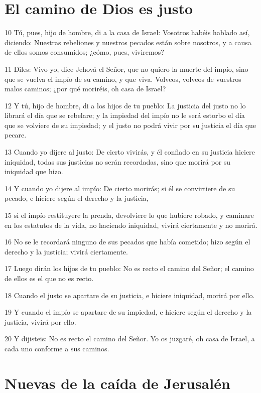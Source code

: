 \section*{El camino de Dios es justo}

\par 10 Tú, pues, hijo de hombre, di a la casa de Israel: Vosotros habéis hablado así, diciendo: Nuestras rebeliones y nuestros pecados están sobre nosotros, y a causa de ellos somos consumidos; ¿cómo, pues, viviremos?
\par 11 Diles: Vivo yo, dice Jehová el Señor, que no quiero la muerte del impío, sino que se vuelva el impío de su camino, y que viva. Volveos, volveos de vuestros malos caminos; ¿por qué moriréis, oh casa de Israel?
\par 12 Y tú, hijo de hombre, di a los hijos de tu pueblo: La justicia del justo no lo librará el día que se rebelare; y la impiedad del impío no le será estorbo el día que se volviere de su impiedad; y el justo no podrá vivir por su justicia el día que pecare.
\par 13 Cuando yo dijere al justo: De cierto vivirás, y él confiado en su justicia hiciere iniquidad, todas sus justicias no serán recordadas, sino que morirá por su iniquidad que hizo.
\par 14 Y cuando yo dijere al impío: De cierto morirás; si él se convirtiere de su pecado, e hiciere según el derecho y la justicia,
\par 15 si el impío restituyere la prenda, devolviere lo que hubiere robado, y caminare en los estatutos de la vida, no haciendo iniquidad, vivirá ciertamente y no morirá.
\par 16 No se le recordará ninguno de sus pecados que había cometido; hizo según el derecho y la justicia; vivirá ciertamente.
\par 17 Luego dirán los hijos de tu pueblo: No es recto el camino del Señor; el camino de ellos es el que no es recto.
\par 18 Cuando el justo se apartare de su justicia, e hiciere iniquidad, morirá por ello.
\par 19 Y cuando el impío se apartare de su impiedad, e hiciere según el derecho y la justicia, vivirá por ello.
\par 20 Y dijisteis: No es recto el camino del Señor. Yo os juzgaré, oh casa de Israel, a cada uno conforme a sus caminos.

\section*{Nuevas de la caída de Jerusalén}

